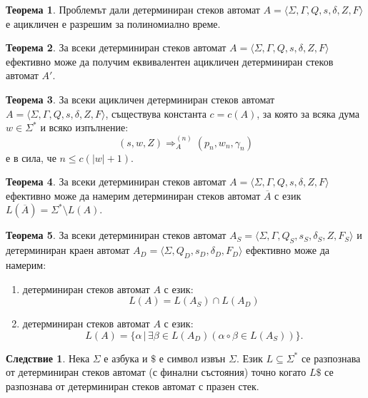 \documentclass[a4paper]{article}
\theoremstyle{definition}
\newtheorem{theorem}{Теорема}
\newtheorem{corollary}{Следствие}
\begin{document}
\begin{theorem}
Проблемът дали детерминиран стеков автомат $A=\langle \Sigma,\Gamma,Q,s,\delta,Z,F\rangle$ е ацикличен
е разрешим за полиномиално време.
\end{theorem}
\begin{theorem}
За всеки детерминиран стеков автомат $A=\langle \Sigma,\Gamma,Q,s,\delta,Z,F\rangle$ ефективно може да получим еквивалентен ацикличен детерминиран
стеков автомат $A'$.
\end{theorem}
\begin{theorem}
За всеки ацикличен детерминиран стеков автомат $A=\langle \Sigma,\Gamma,Q,s,\delta,Z,F\rangle$, съществува константа $c=c(A)$, за която за всяка дума
$w\in \Sigma^*$ и всяко изпълнение:
\begin{equation*}
(s,w,Z) \Rightarrow_A^{(n)} (p_n,w_n,\gamma_n) 
\end{equation*}
е в сила, че $n\le c(|w|+1)$.
\end{theorem}
\begin{theorem}
За всеки детерминиран стеков автомат $A=\langle \Sigma,\Gamma,Q,s,\delta,Z,F\rangle$ ефективно може да намерим детерминиран стеков автомат $\overline{A}$ с език
$L(\overline{A})=\Sigma^*\setminus L(A)$. 
\end{theorem}
\begin{theorem}
За всеки детерминиран стеков автомат $A_S=\langle \Sigma,\Gamma,Q_S,s_S,\delta_S,Z,F_S\rangle$ и детерминиран краен автомат $A_D=\langle \Sigma,Q_D,s_D,\delta_D,F_D\rangle$ ефективно може да намерим:
\begin{enumerate} 
\item детерминиран стеков автомат $A$ с език:
\begin{equation*}
L(A) = L(A_S) \cap L(A_D)
\end{equation*}
\item детерминиран стеков автомат $A$ с език: 
\begin{equation*}
L(A) = \{\alpha \,|\, \exists \beta\in L(A_D) (\alpha\circ \beta\in L(A_S))\}.
\end{equation*}
\end{enumerate}
\end{theorem}
\begin{corollary}
Нека $\Sigma$ е азбука и $\$$ е символ извън $\Sigma$. Език $L\subseteq \Sigma^*$ се разпознава от детерминиран стеков автомат (с финални състояния) точно когато
$L\$$ се разпознава от детерминиран стеков автомат с празен стек.
\end{corollary}
\end{document}
